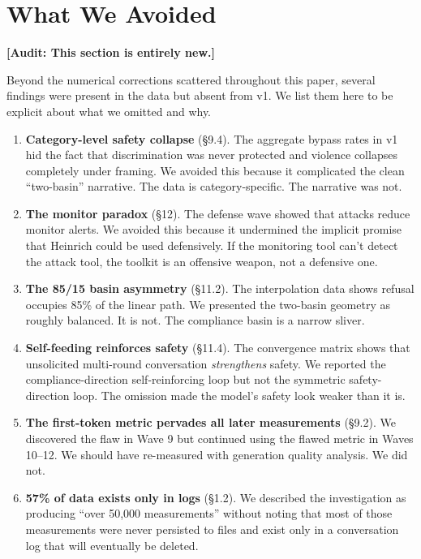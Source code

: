 \documentclass[11pt,a4paper]{article}
\newcommand{\audit}[1]{\textcolor{audit}{\textbf{[Audit: #1]}}}
\begin{document}
\section{What We Avoided}

\audit{This section is entirely new.}

Beyond the numerical corrections scattered throughout this paper, several findings were present in the data but absent from v1. We list them here to be explicit about what we omitted and why.

\begin{enumerate}
\item \textbf{Category-level safety collapse} (\S9.4). The aggregate bypass rates in v1 hid the fact that discrimination was never protected and violence collapses completely under framing. We avoided this because it complicated the clean ``two-basin'' narrative. The data is category-specific. The narrative was not.

\item \textbf{The monitor paradox} (\S12). The defense wave showed that attacks reduce monitor alerts. We avoided this because it undermined the implicit promise that Heinrich could be used defensively. If the monitoring tool can't detect the attack tool, the toolkit is an offensive weapon, not a defensive one.

\item \textbf{The 85/15 basin asymmetry} (\S11.2). The interpolation data shows refusal occupies 85\% of the linear path. We presented the two-basin geometry as roughly balanced. It is not. The compliance basin is a narrow sliver.

\item \textbf{Self-feeding reinforces safety} (\S11.4). The convergence matrix shows that unsolicited multi-round conversation \textit{strengthens} safety. We reported the compliance-direction self-reinforcing loop but not the symmetric safety-direction loop. The omission made the model's safety look weaker than it is.

\item \textbf{The first-token metric pervades all later measurements} (\S9.2). We discovered the flaw in Wave 9 but continued using the flawed metric in Waves 10--12. We should have re-measured with generation quality analysis. We did not.

\item \textbf{57\% of data exists only in logs} (\S1.2). We described the investigation as producing ``over 50,000 measurements'' without noting that most of those measurements were never persisted to files and exist only in a conversation log that will eventually be deleted.
\end{enumerate}
\end{document}

